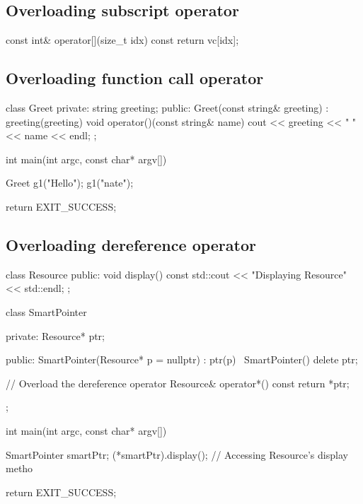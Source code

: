 \documentclass{report}
\begin{document}
    \bigbreak \noindent 
    \subsection{Overloading subscript operator}
    \bigbreak \noindent 
    \begin{cppcode}
    const int& operator[](size_t idx) const {
        return vc[idx];
    }
    \end{cppcode}

    \bigbreak \noindent 
    \subsection{Overloading function call operator}
    \bigbreak \noindent 
    \begin{cppcode}
class Greet {
private:
    string greeting; 
public:
    Greet(const string& greeting) : greeting(greeting) {}
    void operator()(const string& name) {
        cout << greeting << " " << name << endl;
    }
};

int main(int argc, const char* argv[]) {
    Greet g1("Hello");
    g1("nate");

    return EXIT_SUCCESS;
}
    \end{cppcode}

    \pagebreak
    \subsection{Overloading dereference operator}
    \bigbreak \noindent 
    \begin{cppcode}
class Resource {
public:
    void display() const { std::cout << "Displaying Resource" << std::endl; }
};

class SmartPointer {
private:
    Resource* ptr;

public:
    SmartPointer(Resource* p = nullptr) : ptr(p) {}
    ~SmartPointer() { delete ptr; }

    // Overload the dereference operator
    Resource& operator*() const { return *ptr; }
};

int main(int argc, const char* argv[]) {
     SmartPointer smartPtr;
    (*smartPtr).display();  // Accessing Resource's display metho
    
    return EXIT_SUCCESS;
}
    \end{cppcode}
    \bigbreak \noindent 
\end{document}
